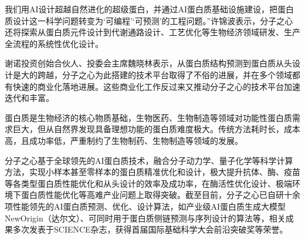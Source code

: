 

我们用AI设计超越自然进化的超级蛋白，并通过AI蛋白质基础设施建设，把蛋白质设计这一科学问题转变为‘可编程’‘可预测’的工程问题。”许锦波表示，分子之心还将探索从蛋白质元件设计到代谢通路设计、工艺优化等生物经济领域研发、生产全流程的系统性优化设计。

谢诺投资创始合伙人、投委会主席魏晓林表示，从蛋白质结构预测到蛋白质从头设计是大的跨越，分子之心为此搭建的技术平台取得了不俗的进展，并在多个领域都有快速的商业化落地进展。这些商业化工作反过来又推动分子之心的技术平台加速迭代和丰富。

蛋白质是生物经济的核心物质基础，生物医药、生物制造等领域对功能性蛋白质需求巨大，但从自然界发现具备理想功能的蛋白质难度极大。传统方法耗时长，成本高，且成功率低，严重制约了生物制药、生物制造等领域的发展。

分子之心基于全球领先的AI蛋白质技术，融合分子动力学、量子化学等科学计算方法，实现小样本甚至零样本的蛋白质精准优化和设计，极大提升抗体、酶、疫苗等各类型蛋白质性能优化和从头设计的效率及成功率，在酶活性优化设计、极端环境下蛋白质性能优化等高难产业问题上取得突破。截至目前，分子之心已自研十余项性能领先的AI蛋白质预测、优化、设计算法，如产业级AI蛋白质生成大模型NewOrigin（达尔文）、可同时用于蛋白质侧链预测与序列设计的算法等，相关成果多次发表于SCIENCE杂志，获得首届国际基础科学大会前沿突破奖等荣誉。
